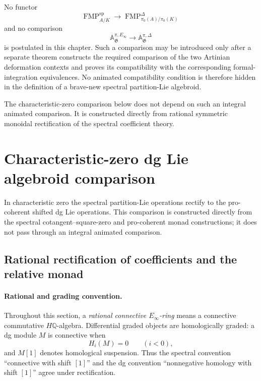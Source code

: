 \begin{remark}
\label{rem:bnla-animated-comparison-deferred}
No functor
\[
    \operatorname{FMP}^{\mathrm{sp}}_{A/K}
    \longrightarrow
    \operatorname{FMP}^{\Delta}_{\pi_0(A)/\pi_0(K)}
\]
and no comparison
\[
    \mathbb A^{\pi,E_\infty}_{\mathfrak G}
    \longrightarrow
    \mathbb A^{\pi,\Delta}_{\mathfrak G}
\]
is postulated in this chapter.  Such a comparison may be introduced only
after a separate theorem constructs the required comparison of the two
Artinian deformation contexts and proves its compatibility with the
corresponding formal-integration equivalences.  No animated compatibility
condition is therefore hidden in the definition of a brave-new spectral
partition-Lie algebroid.
\end{remark}

The characteristic-zero comparison below does not depend on such an integral
animated comparison.  It is constructed directly from rational symmetric
monoidal rectification of the spectral coefficient theory.
\section{Characteristic-zero dg Lie algebroid comparison}
\label{sec:bnla-dg-lie-rectification}

In characteristic zero the spectral partition-Lie operations rectify to the
pro-coherent shifted dg Lie operations.  This comparison is constructed directly
from the spectral cotangent--square-zero and pro-coherent monad constructions;
it does not pass through an integral animated comparison.

\subsection{Rational rectification of coefficients and the relative monad}

\paragraph{Rational and grading convention.}
Throughout this section, a \emph{rational connective $E_\infty$-ring} means a
connective commutative $H\mathbb Q$-algebra.  Differential graded objects are
homologically graded: a dg module $M$ is connective when
\[
    H_i(M)=0
    \qquad(i<0),
\]
and $M[1]$ denotes homological suspension.  Thus the spectral convention
``connective with shift $[1]$'' and the dg convention ``nonnegative homology
with shift $[1]$'' agree under rectification.

